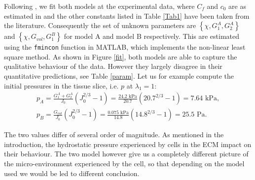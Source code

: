 Following \cite{ecm2}, we fit both models at the experimental data, where $C_f$ and $c_0$ are as estimated in \cite{Netti} and the other constants listed in Table \ref{Tab1} have been taken from the literature. Consequently the set of unknown parameters are $\left\{\chi, G^A_1, G^A_2\right\}$ and  $\left\{\chi, G_{vol}, G^B_1\right\}$ for model A and model B respectively. This are estimated using the \texttt{fmincon} function in MATLAB, which implements the non-linear least square method. As shown in Figure \ref{fit}, both models are able to capture the qualitative behaviour of the data. However they largely disagree in their quantitative predictions, see Table \ref{param}. Let us for example compute the initial pressures in the tissue slice, i.e. $p$ at $\lambda_1=1$:  
\begin{gather}
p_A = \frac{G^A_1+G^A_2}{J_0}(J_0^{2/3}-1) = \frac{24.2 \text{ kPa}}{20.7}(20.7^{2/3}-1) = 7.64 \text{ kPa},\\
p_B = \frac{G_{vol}}{J_0}(J_0^{2/3}-1) = \frac{0.075 \text{ kPa}}{14.8}(14.8^{2/3}-1) = 25.5 \text{ Pa}.
\end{gather}

The two values differ of several order of magnitude. As mentioned in the introduction, the hydrostatic pressure experienced by cells in the ECM impact on their behaviour. The two model however give us a completely different picture of the micro-environment experienced by the cell, so that depending on the model used we would be led to different conclusion. 

